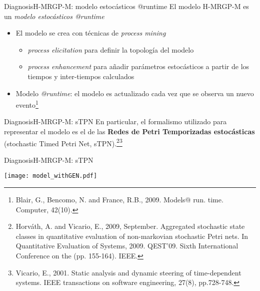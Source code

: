 \documentclass[9pt, handout]{beamer}
\begin{document}
      \begin{frame}{Diagnosis}{H-MRGP-M: modelo estocásticos @runtime}
        El modelo H-MRGP-M es un \textit{modelo estocásticos @runtime}
        \begin{itemize}
          \item El modelo se crea con técnicas de \textit{process mining}
          \begin{itemize}
            \item \textit{process elicitation} para definir la topología del modelo
            \item \textit{process enhancement} para añadir parámetros estocásticos a partir de los tiempos y inter-tiempos calculados
          \end{itemize}
          \item Modelo \textit{@runtime}: el modelo es actualizado cada vez que se observa un nuevo evento\footnote{Blair, G., Bencomo, N. and France, R.B., 2009. Models@ run. time. Computer, 42(10).}
        \end{itemize}
      \end{frame}
      
      \begin{frame}{Diagnosis}{H-MRGP-M: sTPN}
        En particular, el formalismo utilizado para representar el modelo es el de las \textbf{Redes de Petri Temporizadas estocásticas} (stochastic Timed Petri Net, sTPN).\footnote{Horváth, A. and Vicario, E., 2009, September. Aggregated stochastic state classes in quantitative evaluation of non-markovian stochastic Petri nets. In Quantitative Evaluation of Systems, 2009. QEST'09. Sixth International Conference on the (pp. 155-164). IEEE.}\footnote{Vicario, E., 2001. Static analysis and dynamic steering of time-dependent systems. IEEE transactions on software engineering, 27(8), pp.728-748.}
      \end{frame}
      
      \begin{frame}{Diagnosis}{H-MRGP-M: sTPN}
        \begin{center}
          \texttt{[image: model\_withGEN.pdf]}
        \end{center}
      \end{frame}
      
\end{document}
